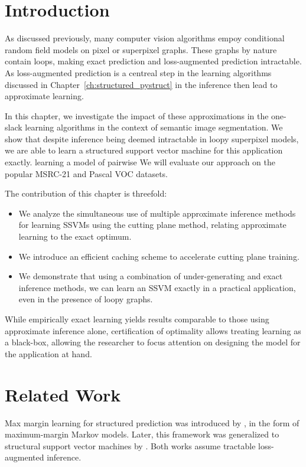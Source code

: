 

\section{Introduction}
As discussed previously, many computer vision algorithms empoy conditional random
field models on pixel or superpixel graphs. These graphs by nature contain loops,
making exact prediction and loss-augmented prediction intractable.
As loss-augmented prediction is a centreal step in the learning algorithms
discussed in Chapter~\ref{ch:structured_pystruct}
in the inference then lead to approximate learning.

In this chapter, we investigate the impact of these approximations in
the one-slack learning algorithms in the context of semantic 
image segmentation. We show that despite inference being deemed intractable in
loopy superpixel models, we are able to learn a structured support vector machine
for this application exactly.
learning a model of pairwise
We will evaluate our approach on the popular MSRC-21 and Pascal VOC datasets.

The contribution of this chapter is threefold:
\begin{itemize}
    \item We analyze the simultaneous use of multiple approximate inference
        methods for learning SSVMs using the cutting plane method, relating
        approximate learning to the exact optimum.
    \item We introduce an efficient caching scheme to accelerate cutting plane
        training.
    \item We demonstrate that using a combination of under-generating and exact
        inference methods, we can learn an SSVM exactly in a practical
        application, even in the presence of loopy graphs.
\end{itemize}

While empirically exact learning yields results comparable to those using
approximate inference alone, certification of optimality allows treating
learning as a black-box, allowing the researcher to focus attention on
designing the model for the application at hand.


\section{Related Work}

Max margin learning for structured prediction was introduced by
\citet{taskar2003max}, in the form of maximum-margin Markov models. Later, this
framework was generalized to structural support vector machines by
\citet{tsochantaridis2006large}. Both works assume tractable loss-augmented
inference.

